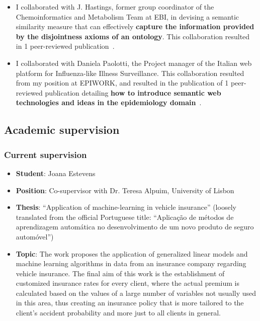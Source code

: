 \begin{itemize}
    \item I collaborated with J. Hastings, former group coordinator of the Chemoinformatics and Metabolism Team at EBI, in devising a semantic similarity measure that can effectively \textbf{capture the information provided by the disjointness axioms of an ontology}. This collaboration resulted in 1 peer-reviewed publication~\autocite{Ferreira2013}.
\end{itemize}

\begin{itemize}
    \item I collaborated with Daniela Paolotti, the Project manager of the Italian web platform for Influenza-like Illness Surveillance. This collaboration resulted from my position at EPIWORK, and resulted in the publication of 1 peer-reviewed publication detailing \textbf{how to introduce semantic web technologies and ideas in the epidemiology domain}~\autocite{Ferreira2012a}.
\end{itemize}


\subsection{Academic supervision} \label{sub:academic-supervision}

\subsubsection{Current supervision}

\begin{itemize}
    \item \textbf{Student}: Joana Estevens
    \item \textbf{Position}: Co-supervisor with Dr. Teresa Alpuim, University of Lisbon
    \item \textbf{Thesis}: ``Application of machine-learning in vehicle insurance'' (loosely translated from the official Portuguese title: ``Aplicação de métodos de aprendizagem automática no desenvolvimento de um novo produto de seguro automóvel'')
    \item \textbf{Topic}: The work proposes the application of generalized linear models and machine learning algorithms in data from an insurance company regarding vehicle insurance. The final aim of this work is the establishment of customized insurance rates for every client, where the actual premium is calculated based on the values of a large number of variables not usually used in this area, thus creating an insurance policy that is more tailored to the client's accident probability and more just to all clients in general.
\end{itemize}


